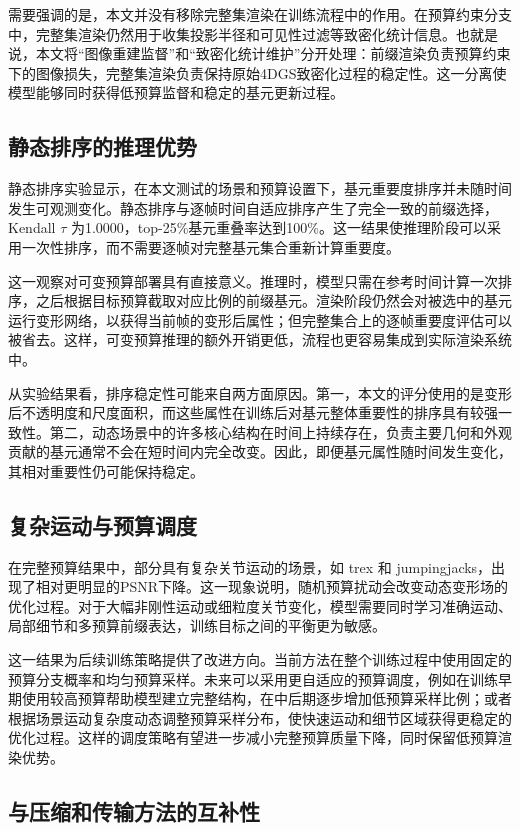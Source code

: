 \documentclass[sn-mathphys]{sn-jnl}
\begin{document}
需要强调的是，本文并没有移除完整集渲染在训练流程中的作用。在预算约束分支中，完整集渲染仍然用于收集投影半径和可见性过滤等致密化统计信息。也就是说，本文将``图像重建监督''和``致密化统计维护''分开处理：前缀渲染负责预算约束下的图像损失，完整集渲染负责保持原始4DGS致密化过程的稳定性。这一分离使模型能够同时获得低预算监督和稳定的基元更新过程。

\subsection{静态排序的推理优势}

静态排序实验显示，在本文测试的场景和预算设置下，基元重要度排序并未随时间发生可观测变化。静态排序与逐帧时间自适应排序产生了完全一致的前缀选择，Kendall $\tau$ 为1.0000，top-25\%基元重叠率达到100\%。这一结果使推理阶段可以采用一次性排序，而不需要逐帧对完整基元集合重新计算重要度。

这一观察对可变预算部署具有直接意义。推理时，模型只需在参考时间计算一次排序，之后根据目标预算截取对应比例的前缀基元。渲染阶段仍然会对被选中的基元运行变形网络，以获得当前帧的变形后属性；但完整集合上的逐帧重要度评估可以被省去。这样，可变预算推理的额外开销更低，流程也更容易集成到实际渲染系统中。

从实验结果看，排序稳定性可能来自两方面原因。第一，本文的评分使用的是变形后不透明度和尺度面积，而这些属性在训练后对基元整体重要性的排序具有较强一致性。第二，动态场景中的许多核心结构在时间上持续存在，负责主要几何和外观贡献的基元通常不会在短时间内完全改变。因此，即便基元属性随时间发生变化，其相对重要性仍可能保持稳定。

\subsection{复杂运动与预算调度}

在完整预算结果中，部分具有复杂关节运动的场景，如 trex 和 jumpingjacks，出现了相对更明显的PSNR下降。这一现象说明，随机预算扰动会改变动态变形场的优化过程。对于大幅非刚性运动或细粒度关节变化，模型需要同时学习准确运动、局部细节和多预算前缀表达，训练目标之间的平衡更为敏感。

这一结果为后续训练策略提供了改进方向。当前方法在整个训练过程中使用固定的预算分支概率和均匀预算采样。未来可以采用更自适应的预算调度，例如在训练早期使用较高预算帮助模型建立完整结构，在中后期逐步增加低预算采样比例；或者根据场景运动复杂度动态调整预算采样分布，使快速运动和细节区域获得更稳定的优化过程。这样的调度策略有望进一步减小完整预算质量下降，同时保留低预算渲染优势。

\subsection{与压缩和传输方法的互补性}
\end{document}
